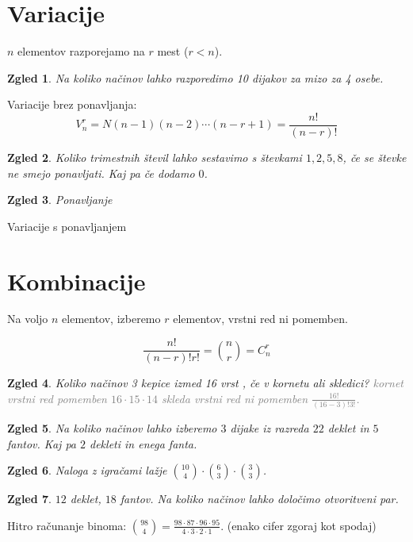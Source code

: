 \documentclass{article}
\newtheorem*{zgled}{Zgled}
\begin{document}
\section{Variacije}

$n$ elementov razporejamo na $r$ mest ($r<n$).

\begin{zgled}
    Na koliko načinov lahko razporedimo 10 dijakov za mizo za 4 osebe.
\end{zgled}

Variacije brez ponavljanja:
\[V_n ^r = N(n-1)(n-2)\cdots (n-r+1)=\frac{n!}{(n-r)!}\]

\begin{zgled}
    Koliko trimestnih števil lahko sestavimo s števkami $1,2,5,8$, če se števke ne smejo ponavljati. Kaj pa če dodamo $0$.
\end{zgled}

\begin{zgled}
    Ponavljanje
\end{zgled}

Variacije s ponavljanjem

\section{Kombinacije}

Na voljo $n$ elementov, izberemo $r$ elementov, vrstni red ni pomemben.

\[\frac{n!}{(n-r)!r!}=\binom{n}{r}=C_n ^r\]

\begin{zgled}
    Koliko načinov 3 kepice izmed 16 vrst , če v kornetu ali skledici? \textcolor{gray}{kornet vrstni red pomemben $16\cdot 15\cdot 14$ skleda vrstni red ni pomemben $\frac{16!}{(16-3)!3!}$.}
\end{zgled}

\begin{zgled}
    Na koliko načinov lahko izberemo $3$ dijake iz razreda $22$ deklet in $5$ fantov. Kaj pa $2$ dekleti in enega fanta. 
\end{zgled}

\begin{zgled}
    Naloga z igračami lažje $\binom{10}{4}\cdot\binom{6}{3}\cdot\binom{3}{3}$.
\end{zgled}

\begin{zgled}
    $12$ deklet, $18$ fantov. Na koliko načinov lahko določimo otvoritveni par.
\end{zgled}

Hitro računanje binoma: $\binom{98}{4}=\frac{98\cdot 87\cdot 96\cdot 95}{4\cdot 3\cdot 2 \cdot 1}$. (enako cifer zgoraj kot spodaj)
\end{document}
